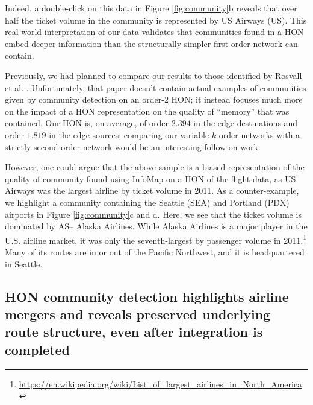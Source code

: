 \documentclass[sigconf]{acmart}
\begin{document}
Indeed, a double-click on this data in Figure \ref{fig:community}b reveals that over half the ticket volume in the community is represented by US Airways (US). This real-world interpretation of our data validates that communities found in a HON embed deeper information than the structurally-simpler first-order network can contain.

Previously, we had planned to compare our results to those identified by Rosvall et al. \cite{Rosvall2014}. Unfortunately, that paper doesn't contain actual examples of communities given by community detection on an order-2 HON; it instead focuses much more on the impact of a HON representation on the quality of ``memory'' that was contained. Our HON is, on average, of order $2.394$ in the edge destinations and order $1.819$ in the edge sources; comparing our variable $k$-order networks with a strictly second-order network would be an interesting follow-on work.

However, one could argue that the above sample is a biased representation of the quality of community found using InfoMap on a HON of the flight data, as US Airways was the largest airline by ticket volume in 2011. As a counter-example, we highlight a community containing the Seattle (SEA) and Portland (PDX) airports in Figure \ref{fig:community}c and d. Here, we see that the ticket volume is dominated by AS-- Alaska Airlines. While Alaska Airlines is a major player in the U.S. airline market, it was only the seventh-largest by passenger volume in 2011.\footnote{\url{https://en.wikipedia.org/wiki/List_of_largest_airlines_in_North_America}} Many of its routes are in or out of the Pacific Northwest, and it is headquartered in Seattle.

\subsection{HON community detection highlights airline mergers and reveals preserved underlying route structure, even after integration is completed}
\end{document}

